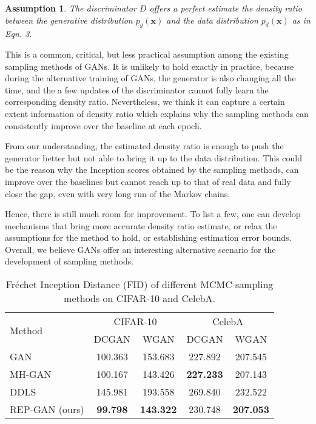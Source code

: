 \documentclass[runningheads]{llncs}
\newtheorem{assumption}{Assumption}
\newcommand{\bx}{\mathbf{x}}
\newcommand{\<}{\left\langle}
\renewcommand{\>}{\right\rangle}
\begin{document}
\begin{assumption}
The discriminator $D$ offers a perfect estimate the density ratio between the generative distribution $p_g(\bx)$ and the data distribution $p_d(\bx)$ as in Eqn. 3.
\end{assumption}

This is a common, critical, but less practical assumption among the existing sampling methods of GANs. It is unlikely to hold exactly in practice, because during the alternative training of GANs, the generator is also changing all the time, and the a few updates of the discriminator cannot fully learn the corresponding density ratio. Nevertheless, we think it can capture a certain extent information of density ratio which explains why the sampling methods can consistently improve over the baseline at each epoch. 

From our understanding, the estimated density ratio is enough to push the generator better but not able to bring it up to the data distribution. This could be the reason why the Inception scores obtained by the sampling methods, can improve over the baselines but cannot reach up to that of real data and fully close the gap, even with very long run of the Markov chains.

Hence, there is still much room for improvement. To list a few, one can develop mechanisms that bring more accurate density ratio estimate, or relax the assumptions for the method to hold, or establishing estimation error bounds. Overall, we believe GANs offer an interesting alternative scenario for the development of sampling methods.


\setcounter{table}{4}
\setcounter{figure}{5}

\begin{table}[t]\centering
    \caption{Fréchet Inception Distance (FID) of different MCMC sampling methods on CIFAR-10 and CelebA.}
    \label{tab:cifar-10-fid-results}
    \begin{tabular}{lcccc}
    \toprule
    \multirow{2}{*}{Method} &  \multicolumn{2}{c}{CIFAR-10} &  \multicolumn{2}{c}{CelebA} \\
    & DCGAN & WGAN & DCGAN & WGAN \\
    \midrule
GAN    & 100.363 & 153.683 & 227.892 & 207.545 \\
MH-GAN \cite{turner2019metropolis} & 100.167 & 143.426 & {\bf 227.233} & 207.143 \\
DDLS \cite{che2020your}   & 145.981 & 193.558 & 269.840 & 232.522 \\
REP-GAN (ours)   & {\bf 99.798}  & {\bf 143.322} & 230.748 & {\bf 207.053} \\    
    \bottomrule
    \end{tabular}
\end{table}
\end{document}

